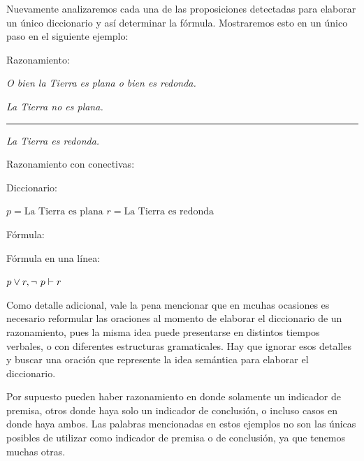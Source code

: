 Nuevamente analizaremos cada una de las proposiciones detectadas para elaborar
un único diccionario y así determinar la fórmula. Mostraremos esto en un único
paso en el siguiente ejemplo:

\begin{example}
    \sindent Razonamiento:

    \dindent \textit{O bien la Tierra es plana o bien es redonda.}

    \dindent \textit{La Tierra no es plana.}

    \quad \rule{0.6\linewidth}{1pt}

    \dindent \textit{La Tierra es redonda.}

    \sindent Razonamiento con conectivas:

    \begin{lreasoning}[width=0.6\textwidth,margin=\value{dindentwidth} pt]
         
    \end{lreasoning}

    \sindent Diccionario:

    \dindent $p = \text{La Tierra es plana}$ \dindent $r = \text{La Tierra es
    redonda}$

    \sindent Fórmula:

    \begin{lreasoning}[width=0.6\textwidth,margin=\value{dindentwidth} pt]
    \end{lreasoning}

    \sindent Fórmula en una línea:

    \dindent $p \lor r, \lnot ~ p \vdash r$
\end{example}

Como detalle adicional, vale la pena mencionar que en mcuhas ocasiones es
necesario reformular las oraciones al momento de elaborar el diccionario de un
razonamiento, pues la misma idea puede presentarse en distintos tiempos
verbales, o con diferentes estructuras gramaticales. Hay que ignorar esos
detalles y buscar una oración que represente la idea semántica para elaborar el
diccionario.

Por supuesto pueden haber razonamiento en donde solamente un indicador de
premisa, otros donde haya solo un indicador de conclusión, o incluso casos en
donde haya ambos. Las palabras mencionadas en estos ejemplos no son las únicas
posibles de utilizar como indicador de premisa o de conclusión, ya que tenemos
muchas otras.

